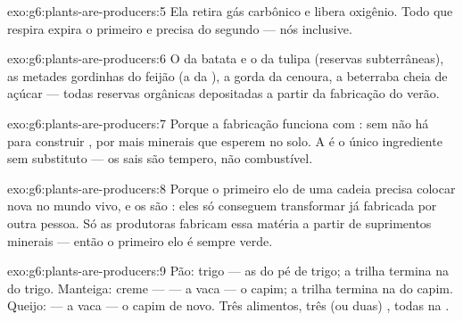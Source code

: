 \begin{solution}{exo:g6:plants-are-producers:5}
Ela retira gás carbônico e libera oxigênio. Todo  que respira
expira o primeiro e precisa do segundo --- nós inclusive.
\end{solution}

\begin{solution}{exo:g6:plants-are-producers:6}
O  da batata e o  da tulipa (reservas subterrâneas), as
metades gordinhas do feijão (a  da ), a
 gorda da cenoura, a beterraba cheia de açúcar --- todas reservas
orgânicas depositadas a partir da fabricação do verão.
\end{solution}

\begin{solution}{exo:g6:plants-are-producers:7}
Porque a fabricação funciona com : sem  não há  para
construir , por mais minerais que esperem no solo. A
 é o único ingrediente sem substituto --- os sais são tempero, não
combustível.
\end{solution}

\begin{solution}{exo:g6:plants-are-producers:8}
Porque o primeiro elo de uma cadeia precisa colocar 
nova no mundo vivo, e os  são : eles só conseguem
transformar  já fabricada por outra pessoa. Só as
produtoras fabricam essa matéria a partir de suprimentos minerais ---
então o primeiro elo é sempre verde.
\end{solution}

\begin{solution}{exo:g6:plants-are-producers:9}
Pão: trigo --- as  do pé de trigo; a trilha termina na 
do trigo. Manteiga: creme ---  --- a vaca --- o capim; a trilha
termina na  do capim. Queijo:  --- a vaca --- o capim de
novo. Três alimentos, três (ou duas) , todas na .
\end{solution}

